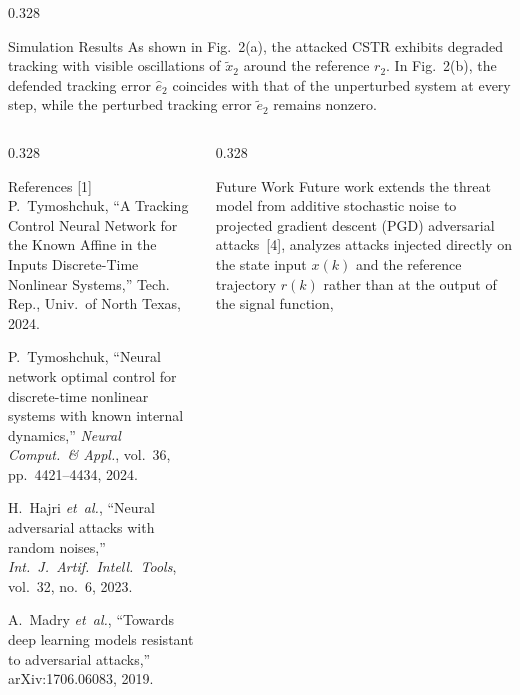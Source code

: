 \documentclass[final]{beamer}
\newlength{\postergap}      \setlength{\postergap}{0.7cm}
\newlength{\rowBh}          \setlength{\rowBh}{52.1cm}
\newlength{\rowCh}          \setlength{\rowCh}{11.1cm}
\begin{document}
\begin{frame}[t]
\begin{center}
\begin{minipage}{0.975\textwidth}
\begin{minipage}[t][\rowBh]{\linewidth}
\begin{columns}[T,totalwidth=\linewidth]
\begin{column}{0.328\linewidth}
\begin{posterpanel}[height=\rowBh]{Simulation Results}
							\vspace{0.20cm}
							As shown in Fig.~2(a), the attacked CSTR exhibits degraded tracking
							with visible oscillations of $\tilde{x}_2$ around the reference
							$r_2$. In Fig.~2(b), the defended tracking error $\hat{e}_2$
							coincides with that of the unperturbed system at every step, while
							the perturbed tracking error $\tilde{e}_2$ remains nonzero.
						\end{posterpanel}
					\end{column}
				\end{columns}
			\end{minipage}

			\vspace{\postergap}

			\begin{minipage}[t][\rowCh]{\linewidth}
				\begin{columns}[T,totalwidth=\linewidth]
					\begin{column}{0.328\linewidth}
						\begin{posterpanel}[height=\rowCh, fontupper=\posterreffont]{References}
							[1] P.\ Tymoshchuk, ``A Tracking Control Neural Network for the Known
							Affine in the Inputs Discrete-Time Nonlinear Systems,'' Tech. Rep.,
							Univ.\ of North Texas, 2024.\par
							[2] P.\ Tymoshchuk, ``Neural network optimal control for discrete-time
							nonlinear systems with known internal dynamics,'' \textit{Neural
								Comput.\ \& Appl.}, vol.~36, pp.~4421--4434, 2024.\par
							[3] H.\ Hajri \textit{et~al.}, ``Neural adversarial attacks with random
							noises,'' \textit{Int.\ J.\ Artif.\ Intell.\ Tools}, vol.~32, no.~6,
							2023.\par
							[4] A.\ Madry \textit{et~al.}, ``Towards deep learning models resistant
							to adversarial attacks,'' arXiv:1706.06083, 2019.
						\end{posterpanel}
					\end{column}
					\begin{column}{0.328\linewidth}
						\begin{posterpanel}[height=\rowCh]{Future Work}
							Future work extends the threat model from additive stochastic noise to
							projected gradient descent (PGD) adversarial attacks~[4], analyzes
							attacks injected directly on the state input $x(k)$ and the reference
							trajectory $r(k)$ rather than at the output of the signal function,

\end{posterpanel}
\end{column}
\end{columns}
\end{minipage}
\end{minipage}
\end{center}
\end{frame}
\end{document}
